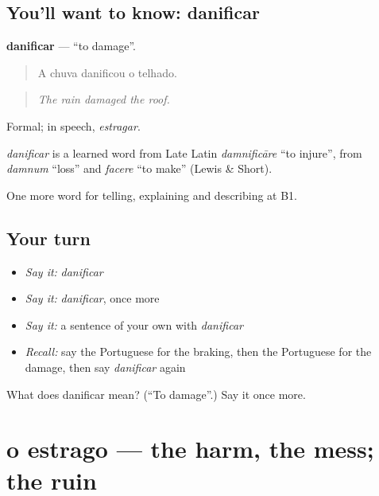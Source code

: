 \subsection*{You'll want to know: danificar}
\textbf{danificar} — \textquotedblleft{}to damage\textquotedblright{}.

\begin{quote}
A chuva danificou o telhado.
\end{quote}

\begin{quote}
\emph{The rain damaged the roof.}
\end{quote}

Formal; in speech, \emph{estragar}.

\begin{cousinweb}
\emph{danificar} is a learned word from Late Latin \emph{damnificāre} \textquotedblleft{}to injure\textquotedblright{}, from \emph{damnum} \textquotedblleft{}loss\textquotedblright{} and \emph{facere} \textquotedblleft{}to make\textquotedblright{} (Lewis \& Short).
\end{cousinweb}

\begin{grammarlens}[title={What you've built}]
One more word for telling, explaining and describing at B1.
\end{grammarlens}

\subsection*{Your turn}
\begin{itemize}
\raggedright
  \item \emph{Say it:} \emph{danificar}
  \item \emph{Say it:} \emph{danificar}, once more
  \item \emph{Say it:} a sentence of your own with \emph{danificar}
  \item \emph{Recall:} say the Portuguese for the braking, then the Portuguese for the damage, then say \emph{danificar} again
\end{itemize}

\begin{tcolorbox}[breakable,colback=teal!4,colframe=teal!35!black,title={Before you move on}]
What does danificar mean? (\textquotedblleft{}To damage\textquotedblright{}.) Say it once more.
\end{tcolorbox}
\section[o estrago]{o estrago — the harm, the mess; the ruin}

